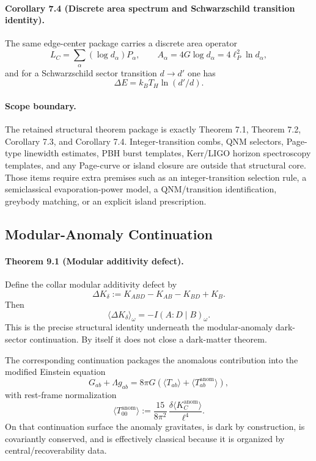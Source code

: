 \paragraph{\textbf{Corollary 7.4 (Discrete area spectrum and Schwarzschild transition identity).}}
The same edge-center package carries a discrete area operator
\[
L_C=\sum_\alpha (\log d_\alpha)P_\alpha,
\qquad
A_\alpha=4G\log d_\alpha=4\ell_P^2\ln d_\alpha,
\]
and for a Schwarzschild sector transition \(d\to d'\) one has
\[
\Delta E=k_B T_H\ln(d'/d).
\]

\paragraph{\textbf{Scope boundary.}}
The retained structural theorem package is exactly Theorem 7.1, Theorem 7.2, Corollary 7.3, and
Corollary 7.4. Integer-transition combs, QNM selectors, Page-type linewidth estimates, PBH burst
templates, Kerr/LIGO horizon spectroscopy templates, and any Page-curve or island closure are
outside that structural core. Those items require extra premises such as an integer-transition
selection rule, a semiclassical evaporation-power model, a QNM/transition identification, greybody
matching, or an explicit island prescription.

\subsection{Modular-Anomaly Continuation}

\paragraph{\textbf{Theorem 9.1 (Modular additivity defect).}}
Define the collar modular additivity defect by
\[
\Delta K_\delta:=K_{ABD}-K_{AB}-K_{BD}+K_B.
\]
Then
\[
\langle \Delta K_\delta\rangle_\omega=-I(A:D\mid B)_\omega.
\]
This is the precise structural identity underneath the modular-anomaly dark-sector continuation. By itself it does not close a dark-matter theorem.

The corresponding continuation packages the anomalous contribution into the modified Einstein
equation
\[
G_{ab}+\Lambda g_{ab}
=
8\pi G\left(\langle T_{ab}\rangle+\langle T_{ab}^{\mathrm{anom}}\rangle\right),
\]
with rest-frame normalization
\[
\langle T_{00}^{\mathrm{anom}}\rangle
:=
\frac{15}{8\pi^2}\,
\frac{\delta\langle K_C^{\mathrm{anom}}\rangle}{\ell^4}.
\]
On that continuation surface the anomaly gravitates, is dark by construction, is covariantly
conserved, and is effectively classical because it is organized by central/recoverability data.

